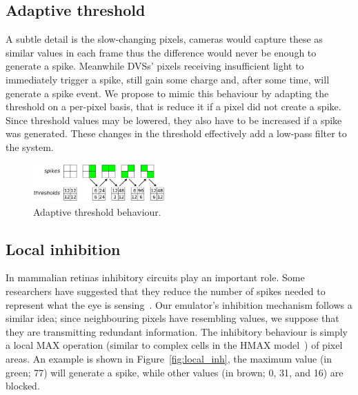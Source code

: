 \documentclass[conference]{IEEEtran}
\begin{document}
\subsection{Adaptive threshold} 
A subtle detail is the slow-changing pixels, cameras would capture these as similar values in each frame thus the difference would never be enough to generate a spike. Meanwhile DVSs' pixels receiving insufficient light to immediately trigger a spike, still gain some charge and, after some time, will generate a spike event. We propose to mimic this behaviour by adapting the threshold on a per-pixel basis, that is reduce it if a pixel did not create a spike. Since threshold values may be lowered, they also have to be increased if a spike was generated. These changes in the threshold effectively add a low-pass filter to the system. 

%
\begin{figure}[hbt]
  \centering
  \includegraphics[width=0.45\textwidth]{adaptive_thresh_boxes}
  \caption{Adaptive threshold behaviour.}
  \label{fig:adpt_thresh}
\end{figure}

\subsection{Local inhibition} 
In mammalian retinas inhibitory circuits play an important role. Some researchers have suggested that they reduce the number of spikes needed to represent what the eye is sensing~\cite{basab}. Our emulator's inhibition mechanism follows a similar idea; since neighbouring pixels have resembling values, we suppose that they are transmitting redundant information. The inhibitory behaviour is simply a local MAX operation (similar to complex cells in the HMAX model~\cite{riesenhuber1999hierarchical}) of pixel areas. An example is shown in Figure~\ref{fig:local_inh}, the maximum value (in green; 77) will generate a spike, while other values (in brown; 0, 31, and 16) are blocked.
\end{document}
